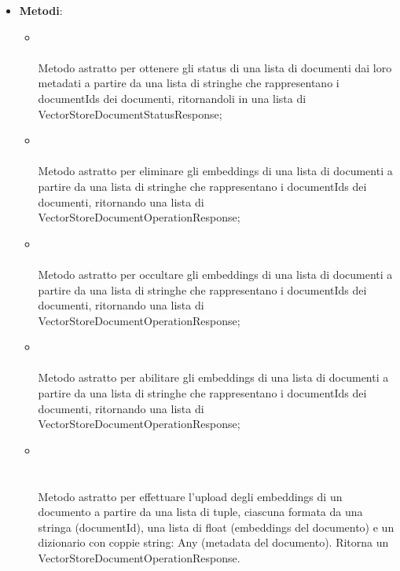 \documentclass[10pt, a4paper]{article}
\begin{document}
\label{VectorStoreManagerDettaglio}
\begin{itemize}
    \item \textbf{Metodi}:
    \begin{itemize}
        \item {}\\ \\
        Metodo astratto per ottenere gli status di una lista di documenti dai loro metadati a partire da una lista di stringhe che rappresentano i documentIds dei documenti, ritornandoli in una lista di VectorStoreDocumentStatusResponse;
        \item {}\\ \\
        Metodo astratto per eliminare gli embeddings di una lista di documenti a partire da una lista di stringhe che rappresentano i documentIds dei documenti, ritornando una lista di VectorStoreDocumentOperationResponse;
        \item {}\\ \\
        Metodo astratto per occultare gli embeddings di una lista di documenti a partire da una lista di stringhe che rappresentano i documentIds dei documenti, ritornando una lista di VectorStoreDocumentOperationResponse;
        \item {}\\ \\
        Metodo astratto per abilitare gli embeddings di una lista di documenti a partire da una lista di stringhe che rappresentano i documentIds dei documenti, ritornando una lista di VectorStoreDocumentOperationResponse;
        \item {}\\ \\ \\
        Metodo astratto per effettuare l'upload degli embeddings di un documento a partire da una lista di tuple, ciascuna formata da una stringa (documentId), una lista di float (embeddings del documento) e un dizionario con coppie string: Any (metadata del documento). Ritorna un VectorStoreDocumentOperationResponse.
    \end{itemize}
\end{itemize}
\end{document}
